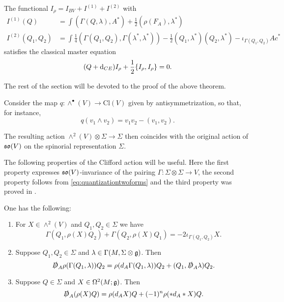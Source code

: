 \documentclass[10pt, oneside]{article}
\newcommand{\Cl}{\mathrm{Cl}}
\begin{document}
\begin{thm}
The functional $I_\rho = I_{BV} + I^{(1)} + I^{(2)}$ with
\begin{align*}
I^{(1)}(Q) &= \int (\Gamma(Q, \lambda), A^*) + \frac{1}{2}(\rho(F_A), \lambda^*) \\
I^{(2)}(Q_1, Q_2) &= \int \frac{1}{4}(\Gamma(Q_1, Q_2), \Gamma(\lambda^*, \lambda^*)) - \frac{1}{2}(Q_1, \lambda^*)(Q_2, \lambda^*) - \iota_{\Gamma(Q_1, Q_2)} A c^*
\end{align*}
satisfies the classical master equation
\[(Q+{\rm d}_{CE}) I_{\rho} + \frac{1}{2}\{I_\rho, I_\rho\} = 0.\]
\label{thm:vectormultipletSUSY}
\end{thm}

The rest of the section will be devoted to the proof of the above theorem.

Consider the map $q\colon \wedge^\bullet(V)\rightarrow \Cl(V)$ given by antisymmetrization, so that, for instance,
\begin{equation}
q(v_1\wedge v_2) = v_1v_2 - (v_1, v_2).
\label{eq:quantizationtwoforms}
\end{equation}

The resulting action $\wedge^2(V)\otimes \Sigma\rightarrow \Sigma$ then coincides with the original action of $\mathfrak{so}(V)$ on the spinorial representation $\Sigma$.

The following properties of the Clifford action will be useful. Here the first property expresses $\mathfrak{so}(V)$-invariance of the pairing $\Gamma\colon\Sigma\otimes \Sigma\rightarrow V$, the second property follows from \eqref{eq:quantizationtwoforms} and the third property was proved in \cite[equation 7.6]{Snygg}.

\begin{prop}
One has the following:
\begin{enumerate}
\item For $X\in\wedge^2(V)$ and $Q_1,Q_2\in\Sigma$ we have
\[\Gamma(Q_1, \rho(X) Q_2) + \Gamma(Q_2, \rho(X) Q_1) = -2\iota_{\Gamma(Q_1, Q_2)} X.\]

\item Suppose $Q_1,Q_2\in\Sigma$ and $\lambda\in\Gamma(M, \Sigma\otimes \mathfrak g)$. Then
\[\slashed{D}_A\rho(\Gamma(Q_1, \lambda)) Q_2 = \rho(d_A \Gamma(Q_1, \lambda)) Q_2 + (Q_1, \slashed{D}_A \lambda) Q_2.\]

\item Suppose $Q\in\Sigma$ and $X\in\Omega^2(M; \mathfrak g)$. Then
\[\slashed{D}_A(\rho(X) Q) = \rho(d_A X)Q + (-1)^n\rho(\ast d_A\ast X) Q.\]
\end{enumerate}
\label{prop:cliffordactionproperties}
\end{prop}
\end{document}
